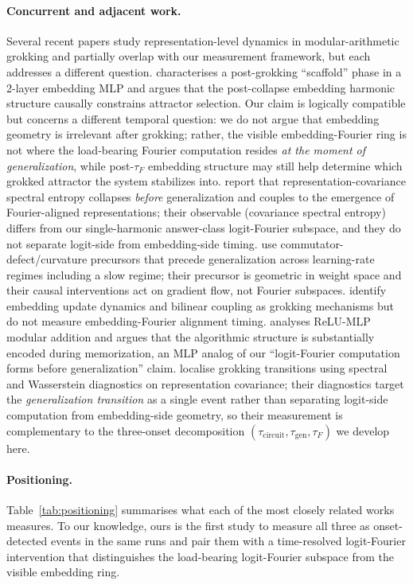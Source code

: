 \documentclass{article}
\newcommand{\taug}{\tau_{\mathrm{gen}}}
\newcommand{\tauf}{\tau_{F}}
\newcommand{\taucirc}{\tau_{\mathrm{circuit}}}
\begin{document}
\paragraph{Concurrent and adjacent work.}
Several recent papers study representation-level dynamics in
modular-arithmetic grokking and partially overlap with our
measurement framework, but each addresses a different question.
\citet{khaliq2026scaffold} characterises a post-grokking
``scaffold'' phase in a 2-layer embedding MLP and argues that the
post-collapse embedding harmonic structure causally constrains
attractor selection. Our claim is logically compatible but concerns
a different temporal question: we do not argue that embedding
geometry is irrelevant after grokking; rather, the visible
embedding-Fourier ring is not where the load-bearing Fourier
computation resides \emph{at the moment of generalization}, while
post-$\tauf$ embedding structure may still help determine which
grokked attractor the system stabilizes into.
\citet{truong2026spectral} report that representation-covariance
spectral entropy collapses \emph{before} generalization and couples
to the emergence of Fourier-aligned representations; their
observable (covariance spectral entropy) differs from our
single-harmonic answer-class logit-Fourier subspace, and they do
not separate logit-side from embedding-side timing.
\citet{xu2026curvature} use commutator-defect/curvature precursors
that precede generalization across learning-rate regimes including
a slow regime; their precursor is geometric in weight space and
their causal interventions act on gradient flow, not Fourier
subspaces.
\citet{alquboj2025embedding} identify embedding update dynamics
and bilinear coupling as grokking mechanisms but do not measure
embedding-Fourier alignment timing.
\citet{swaroop2026latent} analyses ReLU-MLP modular addition and
argues that the algorithmic structure is substantially encoded
during memorization, an MLP analog of our ``logit-Fourier computation
forms before generalization'' claim.
\citet{wang2026transition} localise grokking transitions using
spectral and Wasserstein diagnostics on representation covariance;
their diagnostics target the \emph{generalization transition} as
a single event rather than separating logit-side computation from
embedding-side geometry, so their measurement is complementary to
the three-onset decomposition $(\taucirc,\taug,\tauf)$ we develop
here.

\paragraph{Positioning.}
Table~\ref{tab:positioning} summarises what each of the most closely
related works measures.
To our knowledge, ours is the first study to measure all three
as onset-detected events in the same runs and pair them with a
time-resolved logit-Fourier intervention that distinguishes the
load-bearing logit-Fourier subspace from the visible embedding ring.
\end{document}
